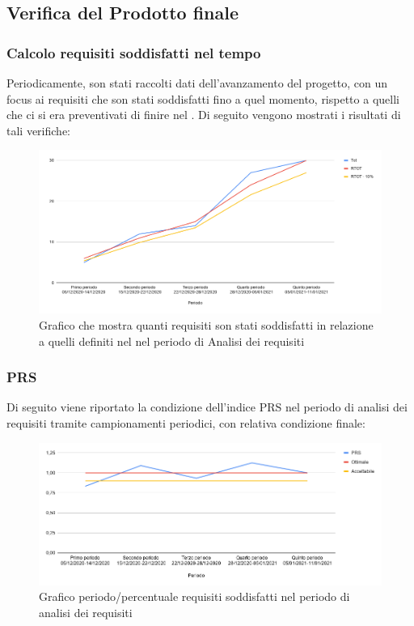 \subsection{Verifica del Prodotto finale}	
	\subsubsection{Calcolo requisiti soddisfatti nel tempo}
		Periodicamente, son stati raccolti dati dell'avanzamento del progetto, con un focus ai requisiti che son stati soddisfatti fino a quel momento, rispetto a quelli che ci si era preventivati di finire nel .
		Di seguito vengono mostrati i risultati di tali verifiche:
		\begin{figure}[H]
			\centering
			\includegraphics[width=0.8\linewidth]{./res/images/rtot.png}
			\caption{Grafico che mostra quanti requisiti son stati soddisfatti in relazione a quelli definiti nel  nel periodo di Analisi dei requisiti}
			\label{fig:Grafico requisiti soddisfatti nel periodo di Analisi dei Requisiti}
		\end{figure}

	\subsubsection{PRS}
		Di seguito viene riportato la condizione dell'indice PRS nel periodo di analisi dei requisiti tramite campionamenti periodici, con relativa condizione finale:
		\begin{figure}[H]
			\centering
			\includegraphics[width=0.8\linewidth]{./res/images/prs.png}
			\caption{Grafico periodo/percentuale requisiti soddisfatti nel periodo di analisi dei requisiti}
			\label{fig:Grafico PRS periodo di analisi dei requisiti}
		\end{figure}

